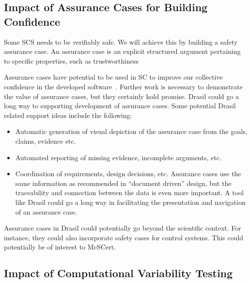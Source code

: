 \documentclass[12pt]{article}
\begin{document}
\subsection{Impact of Assurance Cases for Building Confidence} \label{SecAssuranceCase}

Some SCS needs to be verifiably safe.  We will achieve this by building a safety
assurance case. An assurance case is an explicit structured argument pertaining
to specific properties, such as trustworthiness

Assurance cases have potential to be used in SC to improve our collective
confidence in the developed software~\cite{SmithEtAl2018_ICSEPoster}.  Further
work is necessary to demonstrate the value of assurance cases, but they
certainly hold promise.  Drasil could go a long way to supporting development of
assurance cases.  Some potential Drasil related support ideas include the
following:

\begin{itemize}
\item Automatic generation of visual depiction of the assurance case from the
  goals, claims, evidence etc.
\item Automated reporting of missing evidence, incomplete arguments, etc.
\item Coordination of requirements, design decisions, etc.  Assurance cases use
  the same information as recommended in ``document driven'' design, but the
  traceability and connection between the data is even more important.  A tool
  like Drasil could go a long way in facilitating the presentation and
  navigation of an assurance case.
\end{itemize}

Assurance cases in Drasil could potentially go beyond the scientific context.
For instance, they could also incorporate safety cases for
control systems.  This could potentially be of interest to McSCert.

\subsection{Impact of Computational Variability Testing} \label{SecCVT}
\end{document}
